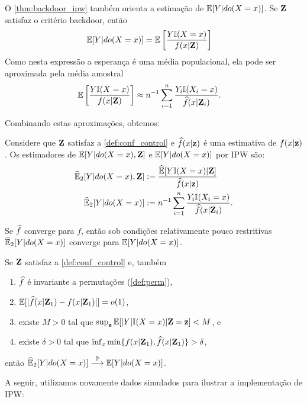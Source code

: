 O \cref{thm:backdoor_ipw} também orienta
a estimação de ${\mathbb E}[Y|do(X=x)]$.
Se ${\mathbf{Z}}$ satisfaz o critério backdoor, então
\begin{align*}
 {\mathbb E}[Y|do(X=x)]
 &= {\mathbb E}\left[\frac{Y {\mathbb I}(X=x)}{f(x|{\mathbf{Z}})}\right]
\end{align*}
Como nesta expressão a esperança é
uma média populacional,
ela pode ser aproximada pela média amostral
\begin{align*}
 {\mathbb E}\left[\frac{Y {\mathbb I}(X=x)}{f(x|{\mathbf{Z}})}\right]
 &\approx n^{-1} \sum_{i=1}^n \frac{Y_i {\mathbb I}(X_i=x)}{\widehat{f}(x|{\mathbf{Z}}_i)}.
\end{align*}

Combinando estas aproximações, obtemos:
\begin{definition}
 \label{def:ipw}
 Considere que ${\mathbf{Z}}$ satisfaz a \cref{def:conf_control} e
 $\widehat{f}(x|{\mathbf{z}})$ é uma estimativa de $f(x|{\mathbf{z}})$.
 Os estimadores de ${\mathbb E}[Y|do(X=x),{\mathbf{Z}}]$ e ${\mathbb E}[Y|do(X=x)]$ 
 por IPW são:
\begin{align*}
 {\widehat{{\mathbb E}}}_{2}[Y|do(X=x),{\mathbf{Z}}] &:= \frac{\widehat{{\mathbb E}}[Y {\mathbb I}(X=x)|{\mathbf{Z}}]}{\widehat{f}(x|{\mathbf{z}})} \\
 {\widehat{{\mathbb E}}}_{2}[Y|do(X=x)] &:= n^{-1} \sum_{i=1}^n \frac{Y_i {\mathbb I}(X_i=x)}{\widehat{f}(x|{\mathbf{Z}}_i)}.
\end{align*}
\end{definition}

Se $\widehat{f}$ converge para $f$, então sob 
condições relativamente pouco restritivas
${\widehat{{\mathbb E}}}_{2}[Y|do(X=x)]$ converge para ${\mathbb E}[Y|do(X=x)]$.

\begin{theorem}
 \label{thm:conv_ipw}
 Se ${\mathbf{Z}}$ satisfaz a \cref{def:conf_control} e, também
 \begin{enumerate}
  \item $\widehat{f}$ é invariante a permutações (\cref{def:perm}),
  \item ${\mathbb E}[|\widehat{f}(x|{\mathbf{Z}}_1)-f(x|{\mathbf{Z}}_1)|] = o(1)$,
  \item existe $M > 0$ tal que $\sup_{\mathbf{z}} {\mathbb E}[|Y| {\mathbb I}(X=x)|{\mathbf{Z}}={\mathbf{z}}] < M$, e
  \item existe $\delta > 0$ tal que $\inf_z \min\{f(x|{\mathbf{Z}}_1), \widehat{f}(x|{\mathbf{Z}}_1)\} > \delta$,
 \end{enumerate}
 então ${\widehat{{\mathbb E}}}_{2}[Y|do(X=x)] \stackrel{{\mathbb P}}{\longrightarrow} {\mathbb E}[Y|do(X=x)]$.
\end{theorem}

A seguir, utilizamos novamente dados simulados para
ilustrar a implementação de IPW:


